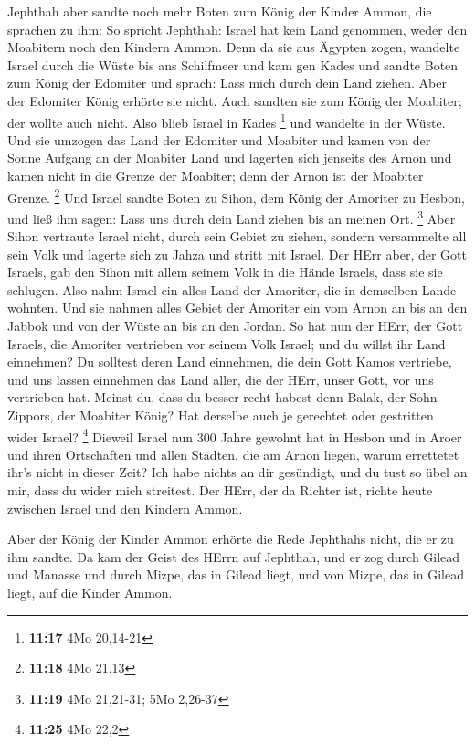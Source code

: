 Jephthah aber sandte noch mehr Boten zum König der Kinder
Ammon,  die sprachen zu ihm: So spricht Jephthah: Israel
hat kein Land genommen, weder den Moabitern noch den Kindern Ammon.
 Denn da sie aus Ägypten zogen, wandelte Israel durch die
Wüste bis ans Schilfmeer und kam gen Kades  und sandte
Boten zum König der Edomiter und sprach: Lass mich durch dein Land
ziehen. Aber der Edomiter König erhörte sie nicht. Auch sandten sie zum
König der Moabiter; der wollte auch nicht. Also blieb Israel in Kades
\footnote{\textbf{11:17} 4Mo 20,14-21}  und wandelte in der
Wüste. Und sie umzogen das Land der Edomiter und Moabiter und kamen von
der Sonne Aufgang an der Moabiter Land und lagerten sich jenseits des
Arnon und kamen nicht in die Grenze der Moabiter; denn der Arnon ist der
Moabiter Grenze. \footnote{\textbf{11:18} 4Mo 21,13}  Und
Israel sandte Boten zu Sihon, dem König der Amoriter zu Hesbon, und ließ
ihm sagen: Lass uns durch dein Land ziehen bis an meinen Ort.
\footnote{\textbf{11:19} 4Mo 21,21-31; 5Mo 2,26-37}  Aber
Sihon vertraute Israel nicht, durch sein Gebiet zu ziehen, sondern
versammelte all sein Volk und lagerte sich zu Jahza und stritt mit
Israel.  Der HErr aber, der Gott Israels, gab den Sihon mit
allem seinem Volk in die Hände Israels, dass sie sie schlugen. Also nahm
Israel ein alles Land der Amoriter, die in demselben Lande wohnten.
 Und sie nahmen alles Gebiet der Amoriter ein vom Arnon an
bis an den Jabbok und von der Wüste an bis an den Jordan. 
So hat nun der HErr, der Gott Israels, die Amoriter vertrieben vor
seinem Volk Israel; und du willst ihr Land einnehmen?  Du
solltest deren Land einnehmen, die dein Gott Kamos vertriebe, und uns
lassen einnehmen das Land aller, die der HErr, unser Gott, vor uns
vertrieben hat.  Meinst du, dass du besser recht habest
denn Balak, der Sohn Zippors, der Moabiter König? Hat derselbe auch je
gerechtet oder gestritten wider Israel? \footnote{\textbf{11:25} 4Mo
  22,2}  Dieweil Israel nun 300 Jahre gewohnt hat in Hesbon
und in Aroer und ihren Ortschaften und allen Städten, die am Arnon
liegen, warum errettetet ihr's nicht in dieser Zeit?  Ich
habe nichts an dir gesündigt, und du tust so übel an mir, dass du wider
mich streitest. Der HErr, der da Richter ist, richte heute zwischen
Israel und den Kindern Ammon.

 Aber der König der Kinder Ammon erhörte die Rede Jephthahs
nicht, die er zu ihm sandte.  Da kam der Geist des HErrn
auf Jephthah, und er zog durch Gilead und Manasse und durch Mizpe, das
in Gilead liegt, und von Mizpe, das in Gilead liegt, auf die Kinder
Ammon.

